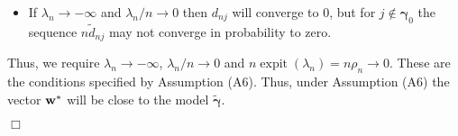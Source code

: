 \documentclass[11pt]{article}
\newtheorem{Main Result}{Main Result}
\def\vectorfontone{\bf}
\def\vectorfonttwo{\boldsymbol}
\def\vw{{\vectorfontone w}}                      %
\def\vgamma{{\vectorfonttwo \gamma}}             %
\DeclareMathOperator{\expit}{expit}
\begin{document}
{\begin{itemize}
	\item If $\lambda_n \to -\infty$ and $\lambda_n/n\to 0$ then $d_{nj}$
	will converge to 0, but for $j\notin\vgamma_0$
	the sequence $n\widetilde{d}_{nj}$ may not converge in probability to zero.
\end{itemize}

\noindent Thus, we require $\lambda_n \to -\infty$, $\lambda_n/n\to 0$
and $n\expit(\lambda_n) = n\rho_n \to 0$. These are the conditions
specified by Assumption (A6). Thus, under Assumption (A6) the vector $\vw^*$
will be close to the model $\widetilde{\vgamma}$.
\vspace{-0.5cm}\begin{flushright}$\Box$\end{flushright}










































































































}
\end{document}
